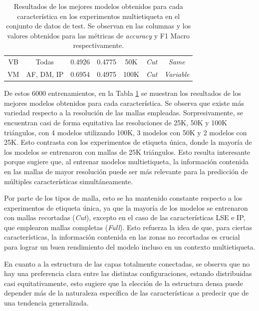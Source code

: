 \begin{table}[h]
{\begin{tabular}{|cc|c|c|c|c|c|}
        \multicolumn{1}{|c|}{VB} & Todas & 0.4926 & 0.4775 & 50K & \textit{Cut} & \textit{Same} \\
        \multicolumn{1}{|c|}{VM} & AF, DM, IP & 0.6954 & 0.4975 & 100K & \textit{Cut} & \textit{Variable} \\ \hline
    \end{tabular}%
    }
    \caption[Resultados de los mejores modelos obtenidos para cada característica en los experimentos multietiqueta]{Resultados de los mejores modelos obtenidos para cada característica en los experimentos multietiqueta en el conjunto de datos de test. Se observan en las columnas  y  los valores obtenidos para las métricas de \textit{accuracy} y F1 Macro respectivamente.}
    \label{table5:multilabel_results}
    \end{table}

De estos 6000 entrenamientos, en la Tabla \ref{table5:multilabel_results} se muestran los resultados de los mejores modelos obtenidos para cada característica. Se observa que existe más variedad respecto a la resolución de las mallas empleadas. Sorpresivamente, se encuentran casi de forma equitativa las resoluciones de 25K, 50K y 100K triángulos, con 4 modelos utilizando 100K, 3 modelos con 50K y 2 modelos con 25K. Esto contrasta con los experimentos de etiqueta única, donde la mayoría de los modelos se entrenaron con mallas de 25K triángulos. Esto resulta interesante porque sugiere que, al entrenar modelos multietiqueta, la información contenida en las mallas de mayor resolución puede ser más relevante para la predicción de múltiples características simultáneamente.

Por parte de los tipos de malla, esto se ha mantenido constante respecto a los experimentos de etiqueta única, ya que la mayoría de los modelos se entrenaron con mallas recortadas (\textit{Cut}), excepto en el caso de las características LSE e IP, que emplearon mallas completas (\textit{Full}). Esto refuerza la idea de que, para ciertas características, la información contenida en las zonas no recortadas es crucial para lograr un buen rendimiento del modelo incluso en un contexto multietiqueta.

En cuanto a la estructura de las capas totalmente conectadas, se observa que no hay una preferencia clara entre las distintas configuraciones, estando distribuidas casi equitativamente, esto sugiere que la elección de la estructura densa puede depender más de la naturaleza específica de las características a predecir que de una tendencia generalizada.

